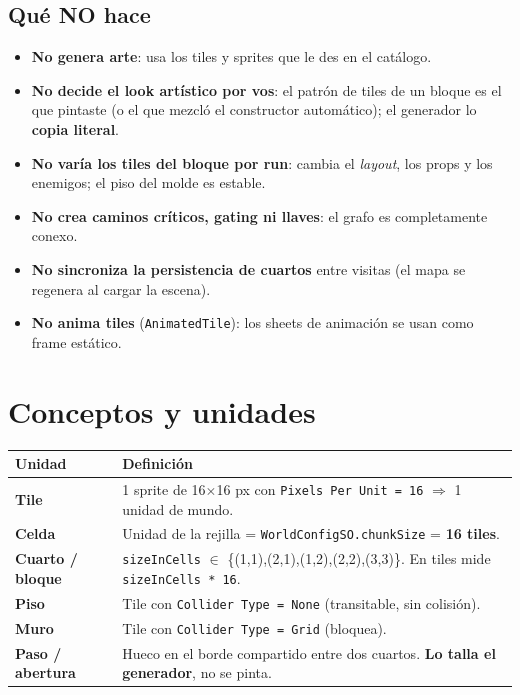 \documentclass[11pt,a4paper]{article}
\newcommand{\code}[1]{\texttt{#1}}
\begin{document}
\subsection*{Qué NO hace}
\begin{itemize}[leftmargin=1.4em]
  \item \textbf{No genera arte}: usa los tiles y sprites que le des en el catálogo.
  \item \textbf{No decide el look artístico por vos}: el patrón de tiles de un bloque es el que pintaste (o el que mezcló el constructor automático); el generador lo \textbf{copia literal}.
  \item \textbf{No varía los tiles del bloque por run}: cambia el \emph{layout}, los props y los enemigos; el piso del molde es estable.
  \item \textbf{No crea caminos críticos, gating ni llaves}: el grafo es completamente conexo.
  \item \textbf{No sincroniza la persistencia de cuartos} entre visitas (el mapa se regenera al cargar la escena).
  \item \textbf{No anima tiles} (\code{AnimatedTile}): los sheets de animación se usan como frame estático.
\end{itemize}

\section{Conceptos y unidades}

\begin{center}
\begin{tabular}{@{}p{3.2cm}p{11.2cm}@{}}
\toprule
\textbf{Unidad} & \textbf{Definición} \\
\midrule
\textbf{Tile} & 1 sprite de 16$\times$16 px con \code{Pixels Per Unit = 16} $\Rightarrow$ 1 unidad de mundo. \\
\textbf{Celda} & Unidad de la rejilla = \code{WorldConfigSO.chunkSize} = \textbf{16 tiles}. \\
\textbf{Cuarto / bloque} & \code{sizeInCells} $\in$ \{(1,1),(2,1),(1,2),(2,2),(3,3)\}. En tiles mide \code{sizeInCells * 16}. \\
\textbf{Piso} & Tile con \code{Collider Type = None} (transitable, sin colisión). \\
\textbf{Muro} & Tile con \code{Collider Type = Grid} (bloquea). \\
\textbf{Paso / abertura} & Hueco en el borde compartido entre dos cuartos. \textbf{Lo talla el generador}, no se pinta. \\
\bottomrule
\end{tabular}
\end{center}
\end{document}
